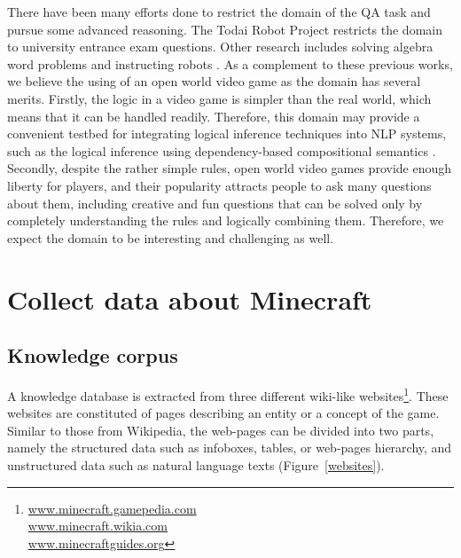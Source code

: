 \documentclass[12pt]{article}
\begin{document}
There have been many efforts done to restrict the domain of the QA task and pursue some advanced reasoning. The Todai Robot Project \cite{fujita2014overview} restricts the domain to university entrance exam questions. Other research includes solving algebra word problems \cite{kushman2014learning} and instructing robots \cite{misra2015environment}. As a complement to these previous works, we believe the using of an open world video game as the domain has several merits. Firstly, the logic in a video game is simpler than the real world, which means that it can be handled readily. Therefore, this domain may provide a convenient testbed for integrating logical inference techniques into NLP systems, such as the logical inference using dependency-based compositional semantics \cite{tian2014logical}. Secondly, despite the rather simple rules, open world video games provide enough liberty for players, and their popularity attracts people to ask many questions about them, including creative and fun questions that can be solved only by completely understanding the rules and logically combining them. Therefore, we expect the domain to be interesting and challenging as well.

\newpage
\section{Collect data about Minecraft}

\subsection{Knowledge corpus}
A knowledge database is extracted from three different wiki-like websites\footnote{
\href{http://www.minecraft.gamepedia.com/}{www.minecraft.gamepedia.com}
\\\href{http://www.minecraft.wikia.com/}{www.minecraft.wikia.com}
\\\href{http://www.minecraftguides.org/}{www.minecraftguides.org}}. These websites are constituted of pages describing an entity or a concept of the game. Similar to those from Wikipedia, the web-pages can be divided into two parts, namely the structured data such as infoboxes, tables, or web-pages hierarchy, and unstructured data such as natural language texts (Figure~\ref{websites}).
\end{document}
